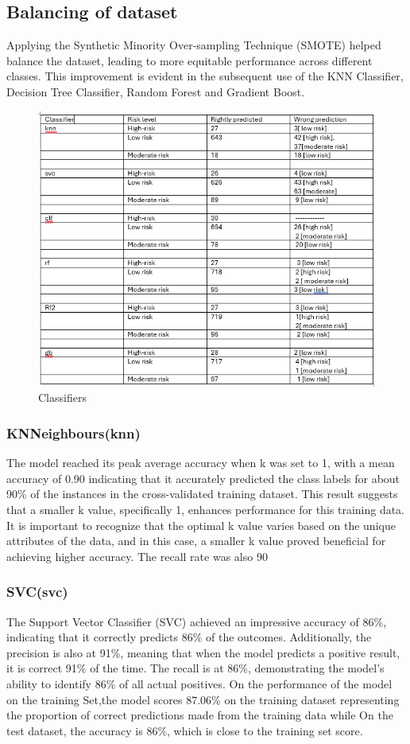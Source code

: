 \documentclass[a4paper]{article}
\begin{document}
\subsection{Balancing of  dataset}
Applying the Synthetic Minority Over-sampling Technique (SMOTE) helped balance the dataset, leading to more equitable performance across different classes. This improvement is evident in the subsequent use of the KNN Classifier, Decision Tree Classifier, Random Forest and Gradient Boost.
\begin{figure}
    \centering
    \includegraphics[width=0.5\linewidth]{class.png}
    \caption{Classifiers}
    \label{fig:class}
\end{figure}
\subsubsection{KNNeighbours(knn)}

The model reached its peak average accuracy when k was set to 1, with a mean accuracy of 0.90 indicating that it accurately predicted the class labels for about 90\% of the instances in the cross-validated training dataset. This result suggests that a smaller k value, specifically 1, enhances performance for this training data. It is important to recognize that the optimal k value varies based on the unique attributes of the data, and in this case, a smaller k value proved beneficial for achieving higher accuracy. The recall rate was also 90%

\subsubsection{SVC(svc)}

The Support Vector Classifier (SVC) achieved an impressive accuracy of 86\%, indicating that it correctly predicts 86\% of the outcomes. Additionally, the precision is also at 91\%, meaning that when the model predicts a positive result, it is correct 91\% of the time. The recall is at 86\%, demonstrating the model's ability to identify 86\% of all actual positives. On the performance of the model on the training Set,the model scores 87.06\% on the training dataset representing the proportion of correct predictions made from the training data while On the test dataset, the accuracy is 86\%, which is close to the training set score. 
\end{document}
